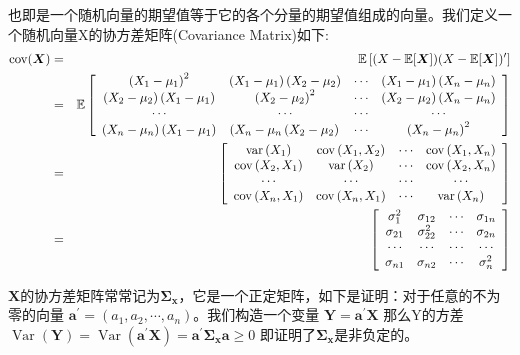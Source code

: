 \begin{enumerate}[1、]
		也即是一个随机向量的期望值等于它的各个分量的期望值组成的向量。我们定义一个随机向量X的协方差矩阵(Covariance Matrix)如下:
		\vspace{-1em}
		\begin{eqnarray}
        \operatorname{cov}(\boldsymbol{X}) & = &   \mathbb{E} \left[(X-\mathbb{E}[\boldsymbol{X}])(X-\mathbb{E}[\boldsymbol{X}])^{\prime}\right] 
        \vspace{1.5em} \notag \\
		& = & \mathbb{E} \left[\begin{array}{cccc}
			\left(X_{1}-\mu_{1}\right)^{2} & \left(X_{1}-\mu_{1}\right)\left(X_{2}-\mu_{2}\right) & \cdots & \left(X_{1}-\mu_{1}\right)\left(X_{n}-\mu_{n}\right) \\
			\left(X_{2}-\mu_{2}\right)\left(X_{1}-\mu_{1}\right) & \left(X_{2}-\mu_{2}\right)^{2} & \cdots & \left(X_{2}-\mu_{2}\right)\left(X_{n}-\mu_{n}\right) \\
			\cdots & \cdots & \cdots & \cdots \\
			\left(X_{n}-\mu_{n}\right)\left(X_{1}-\mu_{1}\right) & \left(X_{n}-\mu_{n}\left(X_{2}-\mu_{2}\right)\right. & \cdots & \left(X_{n}-\mu_{n}\right)^{2}
			\end{array}\right] \notag  \vspace{1.5em}\\
		& = & \left[\begin{array}{cccc}
			\operatorname{var}\left(X_{1}\right) & \operatorname{cov}\left(X_{1}, X_{2}\right) & \cdots & \operatorname{cov}\left(X_{1}, X_{n}\right) \\
			\operatorname{cov}\left(X_{2}, X_{1}\right) & \operatorname{var}\left(X_{2}\right) & \cdots & \operatorname{cov}\left(X_{2}, X_{n}\right) \\
			\cdots & \cdots & \cdots & \cdots \\
			\operatorname{cov}\left(X_{n}, X_{1}\right) & \operatorname{cov}\left(X_{n}, X_{1}\right) & \cdots & \operatorname{var}\left(X_{n}\right)
			\end{array}\right] \notag  \vspace{1.5em} \\
		& = & \left[\begin{array}{cccc}
			\sigma_{1}^{2} & \sigma_{12} & \cdots & \sigma_{1 n} \\
			\sigma_{21} & \sigma_{22}^{2} & \cdots & \sigma_{2 n} \\
			\cdots & \cdots & \cdots & \cdots \\
			\sigma_{n 1} & \sigma_{n 2} & \cdots & \sigma_{n}^{2}
			\end{array}\right] \notag 
		\end {eqnarray}
		
    $ \boldsymbol{X} $的协方差矩阵常常记为$ \boldsymbol{\Sigma_{x}} $，它是一个正定矩阵，如下是证明：对于任意的不为零的向量
    $ \boldsymbol{ a^{\prime}}=\left(a_{1}, a_{2}, \cdots, a_{n}\right)$。我们构造一个变量 $ \boldsymbol{ Y = a^{\prime}X }$ 
    那么Y的方差 $ \operatorname{Var}(\boldsymbol{Y})=\operatorname{Var}\left( \boldsymbol{a^{\prime} X }\right)= \boldsymbol{a^{\prime} \Sigma_{x} a} \geq 0 $ 
    即证明了$ \boldsymbol{ \Sigma_{x} } $是非负定的。
\end{enumerate}

